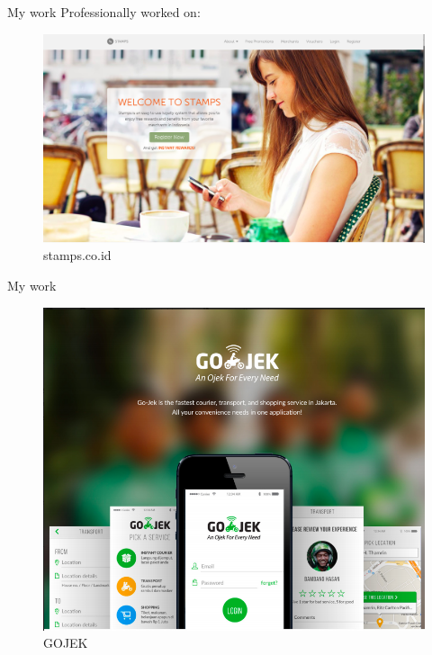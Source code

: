 \documentclass{beamer}
\begin{document}
  \begin{frame}{My work}
  	Professionally worked on:
	
	\begin{center}
		\begin{figure}
		\includegraphics[scale=0.2]{images/stamps.png}
		\caption{stamps.co.id}
		\end{figure}
	\end{center}
  \end{frame}
    \begin{frame}{My work}	
	\begin{center}
		\begin{figure}
		\includegraphics[scale=0.3]{images/gojek.png}
		\caption{GOJEK}
		\end{figure}
	\end{center}
  \end{frame}
\end{document}
